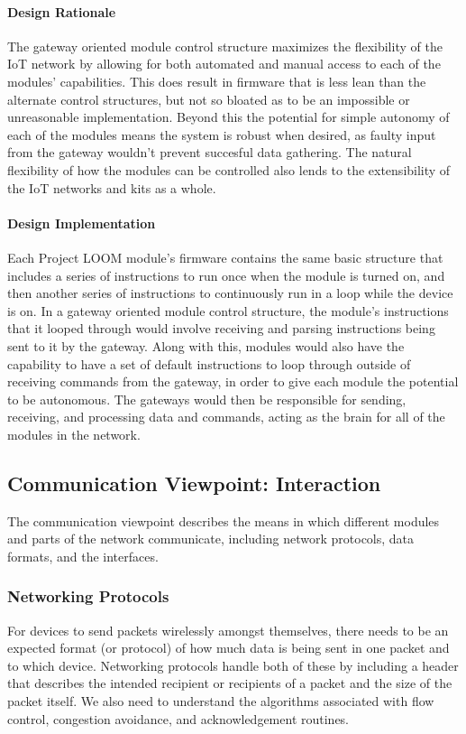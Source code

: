 \documentclass[onecolumn, draftclsnofoot,10pt, compsoc]{IEEEtran}
\begin{document}
\paragraph{Design Rationale}
    The gateway oriented module control structure maximizes the flexibility of the IoT network by allowing for both automated and manual access to each of the modules' capabilities. This does result in firmware that is less lean than the alternate control structures, but not so bloated as to be an impossible or unreasonable implementation. Beyond this the potential for simple autonomy of each of the modules means the system is robust when desired, as faulty input from the gateway wouldn't prevent succesful data gathering. The natural flexibility of how the modules can be controlled also lends to the extensibility of the IoT networks and kits as a whole. 

\paragraph{Design Implementation}
    Each Project LOOM module's firmware contains the same basic structure that includes a series of instructions to run once when the module is turned on, and then another series of instructions to continuously run in a loop while the device is on. In a gateway oriented module control structure, the module's instructions that it looped through would involve receiving and parsing instructions being sent to it by the gateway. Along with this, modules would also have the capability to have a set of default instructions to loop through outside of receiving commands from the gateway, in order to give each module the potential to be autonomous. The gateways would then be responsible for sending, receiving, and processing data and commands, acting as the brain for all of the modules in the network. 






\subsection{Communication Viewpoint: Interaction}
    The communication viewpoint describes the means in which different modules and parts of the network communicate, including network protocols, data formats, and the interfaces.

\subsubsection{Networking Protocols}
    For devices to send packets wirelessly amongst themselves, there needs to be an expected format (or protocol) of how much data is being sent in one packet and to which device. Networking protocols handle both of these by including a header that describes the intended recipient or recipients of a packet and the size of the packet itself. We also need to understand the algorithms associated with flow control, congestion avoidance, and acknowledgement routines.
\end{document}
